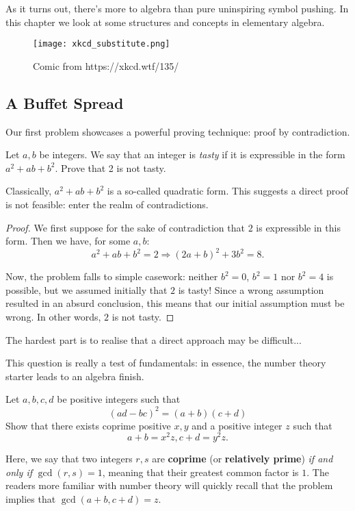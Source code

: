 \documentclass[../main.tex]{subfiles}
\begin{document}
As it turns out, there's more to algebra than pure uninspiring symbol pushing. In this chapter we look at some structures and concepts in elementary algebra.

\begin{figure}[H]
    \centering
    \texttt{[image: xkcd\_substitute.png]}
    \caption{Comic from https://xkcd.wtf/135/}
\end{figure}

\subsection{A Buffet Spread}
Our first problem showcases a powerful proving technique: proof by contradiction.
\begin{example}[Classic]
Let $a, b$ be integers. We say that an integer is \textit{tasty} if it is expressible in the form $a^2+ab+b^2$. Prove that 2 is not tasty.
\end{example}
Classically, $a^2+ab+b^2$ is a so-called quadratic form. This suggests a direct proof is not feasible: enter the realm of contradictions.

\begin{proof}
We first suppose for the sake of contradiction that $2$ is expressible in this form. Then we have, for some $a,b$: 
$$a^2+ab+b^2=2 \Longrightarrow (2a+b)^2+3b^2=8.$$

Now, the problem falls to simple casework: neither $b^2=0$, $b^2=1$ nor $b^2=4$ is possible, but we assumed initially that $2$ is tasty! Since a wrong assumption resulted in an absurd conclusion, this means that our initial assumption must be wrong. In other words, $2$ is not tasty.
\end{proof}
\begin{moral}
The hardest part is to realise that a direct approach may be difficult...
\end{moral}
This question is really a test of fundamentals: in essence, the number theory starter leads to an algebra finish.
\begin{example}[2021 H3 Math P1 Q4]
Let $a,b,c,d$ be positive integers such that
\begin{equation}\label{5.3-det}
    (ad-bc)^2=(a+b)(c+d)
\end{equation}
Show that there exists coprime positive $x,y$ and a positive integer $z$ such that
$$a+b=x^2z, c+d=y^2z.$$
\end{example}
Here, we say that two integers $r,s$ are \textbf{coprime} (or \textbf{relatively prime}) \textit{if and only if} $\gcd(r,s)=1$, meaning that their greatest common factor is $1$. The readers more familiar with number theory will quickly recall that the problem implies that $\gcd(a+b, c+d)=z$.
\end{document}
